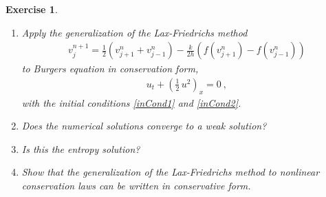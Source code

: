\documentclass[10pt,letterpaper]{article}
\newcommand{\rb}[1]{ \left(  {#1} \right) }
\newcommand{\frb}[1]{ \left(  {#1} \right) }
\theoremstyle{break}
\newtheorem{exercise}{Exercise}
\begin{document}
\begin{exercise}
	\begin{enumerate}
		\item
		Apply the generalization of the Lax-Friedrichs method
		\begin{gather}
			v_{j}^{n+1}=\frac{1}{2}\rb{v_{j+1}^{n}+v_{j-1}^{n}}
				-\frac{k}{2h}\rb{f\frb{v_{j+1}^{n}}-f\frb{v_{j-1}^{n}}}
		\end{gather}
		to Burgers equation in conservation form,
		\begin{gather}
			u_t+\rb{\frac{1}{2}\, u^2}_x=0\ ,
		\end{gather}
		with the initial conditions \eqref{inCond1} and \eqref{inCond2}.

		\item
		Does the numerical solutions converge to a weak solution?

		\item
		Is this the entropy solution?

		\item
		Show that the generalization of the Lax-Friedrichs method to nonlinear conservation laws can be written in conservative form.
	\end{enumerate}
\end{exercise}
\end{document}
